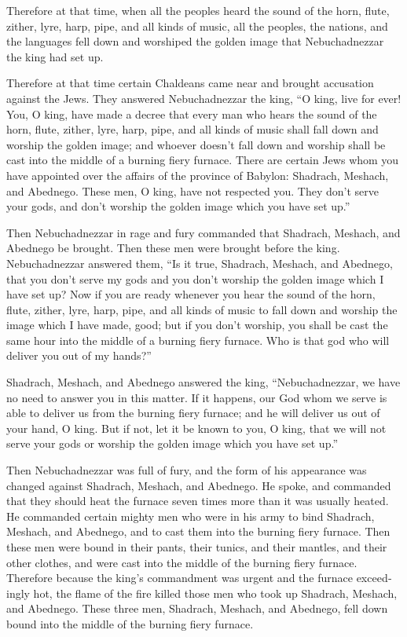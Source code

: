 \begin{paracol}{2}
\begin{otherlanguage}{english}
 Therefore at that time, when all the peoples heard the
sound of the horn, flute, zither, lyre, harp, pipe, and all kinds of
music, all the peoples, the nations, and the languages fell down and
worshiped the golden image that Nebuchadnezzar the king had set up.

 Therefore at that time certain Chaldeans came near and
brought accusation against the Jews.  They answered
Nebuchadnezzar the king, ``O king, live for ever!  You, O
king, have made a decree that every man who hears the sound of the horn,
flute, zither, lyre, harp, pipe, and all kinds of music shall fall down
and worship the golden image;  and whoever doesn't fall
down and worship shall be cast into the middle of a burning fiery
furnace.  There are certain Jews whom you have appointed
over the affairs of the province of Babylon: Shadrach, Meshach, and
Abednego. These men, O king, have not respected you. They don't serve
your gods, and don't worship the golden image which you have set up.''

 Then Nebuchadnezzar in rage and fury commanded that
Shadrach, Meshach, and Abednego be brought. Then these men were brought
before the king.  Nebuchadnezzar answered them, ``Is it
true, Shadrach, Meshach, and Abednego, that you don't serve my gods and
you don't worship the golden image which I have set up? 
Now if you are ready whenever you hear the sound of the horn, flute,
zither, lyre, harp, pipe, and all kinds of music to fall down and
worship the image which I have made, good; but if you don't worship, you
shall be cast the same hour into the middle of a burning fiery furnace.
Who is that god who will deliver you out of my hands?''

 Shadrach, Meshach, and Abednego answered the king,
``Nebuchadnezzar, we have no need to answer you in this matter.
 If it happens, our God whom we serve is able to deliver
us from the burning fiery furnace; and he will deliver us out of your
hand, O king.  But if not, let it be known to you, O
king, that we will not serve your gods or worship the golden image which
you have set up.''

 Then Nebuchadnezzar was full of fury, and the form of
his appearance was changed against Shadrach, Meshach, and Abednego. He
spoke, and commanded that they should heat the furnace seven times more
than it was usually heated.  He commanded certain mighty
men who were in his army to bind Shadrach, Meshach, and Abednego, and to
cast them into the burning fiery furnace.  Then these men
were bound in their pants, their tunics, and their mantles, and their
other clothes, and were cast into the middle of the burning fiery
furnace.  Therefore because the king's commandment was
urgent and the furnace exceedingly hot, the flame of the fire killed
those men who took up Shadrach, Meshach, and Abednego. 
These three men, Shadrach, Meshach, and Abednego, fell down bound into
the middle of the burning fiery furnace.


\end{otherlanguage}
\end{paracol}
